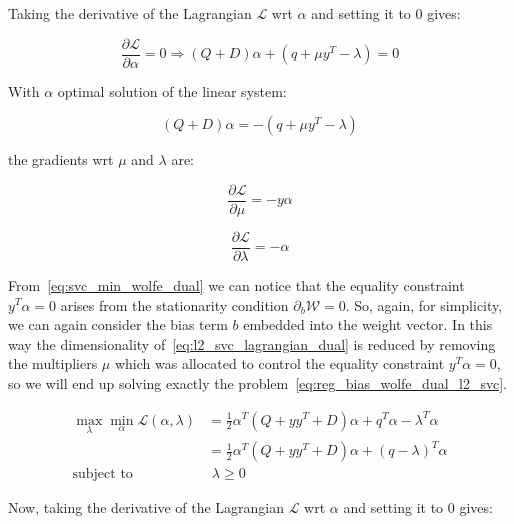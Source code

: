 Taking the derivative of the Lagrangian $\mathcal{L}$ wrt $\alpha$ and setting it to 0 gives:

\begin{equation} \label{eq:l2_svc_lagrangian_der_a}
	\frac{\partial \mathcal{L}}{\partial \alpha}=0\Rightarrow (Q+D) \alpha + (q + \mu y^T - \lambda) = 0
\end{equation}

With $\alpha$ optimal solution of the linear system:

\begin{equation} \label{eq:l2_svc_lagrangian_sol}
    (Q+D) \alpha = - (q + \mu y^T - \lambda)
\end{equation}

the gradients wrt $\mu$ and $\lambda$ are:

\begin{equation} \label{eq:l2_svc_lagrangian_der_mu}
	\frac{\partial \mathcal{L}}{\partial \mu}=-y \alpha
\end{equation}

\begin{equation} \label{eq:l2_svc_lagrangian_der_lambda}
    \frac{\partial \mathcal{L}}{\partial \lambda}=-\alpha
\end{equation}

From~\eqref{eq:svc_min_wolfe_dual} we can notice that the equality constraint $y^T \alpha = 0$ arises from the stationarity condition $\partial_{{b}} \mathcal{W}=0$. So, again, for simplicity, we can again consider the bias term $b$ embedded into the weight vector. In this way the dimensionality of~\eqref{eq:l2_svc_lagrangian_dual} is reduced by removing the multipliers $\mu$ which was allocated to control the equality constraint $y^T \alpha=0$, so we will end up solving exactly the problem~\eqref{eq:reg_bias_wolfe_dual_l2_svc}.

\begin{equation} \label{eq:l2_svc_lb_lagrangian_dual}
	\begin{aligned}
    	\max_{\lambda} \min_{\alpha} \mathcal{L}(\alpha,\lambda) &= \frac{1}{2} \alpha^T (Q + yy^T + D) \alpha+q^T\alpha - \lambda^T \alpha \\
    &= \frac{1}{2} \alpha^T (Q + yy^T + D) \alpha + (q - \lambda)^T \alpha \\
    \text{subject to} \quad & \,\, \lambda \geq 0
	\end{aligned}
\end{equation}

Now, taking the derivative of the Lagrangian $\mathcal{L}$ wrt $\alpha$ and setting it to 0 gives:

